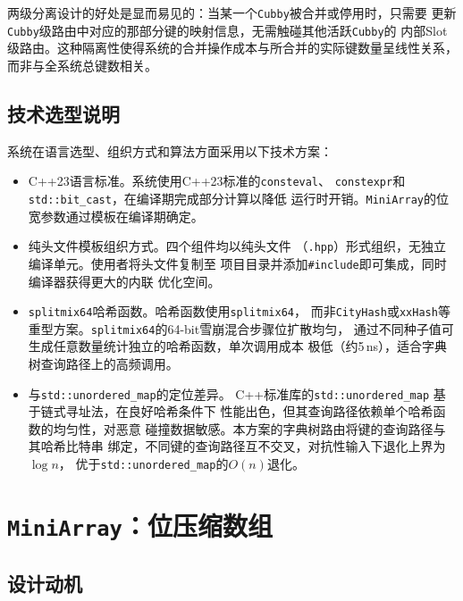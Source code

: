 \documentclass[
    type = bachelor,
    fontset = win,
    decl-page = true,
  ]{njuthesis}
\begin{document}
\noindent 两级分离设计的好处是显而易见的：当某一个\texttt{Cubby}被合并或停用时，只需要
更新\texttt{Cubby}级路由中对应的那部分键的映射信息，无需触碰其他活跃\texttt{Cubby}的
内部Slot级路由。这种隔离性使得系统的合并操作成本与所合并的实际键数量呈线性关系，
而非与全系统总键数相关。

\subsection{技术选型说明}

系统在语言选型、组织方式和算法方面采用以下技术方案：

\begin{itemize}
  \item C++23语言标准。系统使用C++23标准的\texttt{consteval}、
    \texttt{constexpr}和\texttt{std::bit\_cast}，在编译期完成部分计算以降低
    运行时开销。\texttt{MiniArray}的位宽参数通过模板在编译期确定。
  \item 纯头文件模板组织方式。四个组件均以纯头文件
    （\texttt{.hpp}）形式组织，无独立编译单元。使用者将头文件复制至
    项目目录并添加\texttt{\#include}即可集成，同时编译器获得更大的内联
    优化空间。
  \item \texttt{splitmix64}哈希函数。哈希函数使用\texttt{splitmix64}\cite{5}，
    而非\texttt{CityHash}或\texttt{xxHash}等重型方案。\texttt{splitmix64}的64-bit雪崩混合步骤位扩散均匀，
    通过不同种子值可生成任意数量统计独立的哈希函数\cite{9}，单次调用成本
    极低（约5\,ns），适合字典树查询路径上的高频调用。
  \item 与\texttt{std::unordered\_map}的定位差异。\newline
    C++标准库的\texttt{std::unordered\_map}\newline
    基于链式寻址法，在良好哈希条件下
    性能出色，但其查询路径依赖单个哈希函数的均匀性，对恶意
    碰撞数据敏感。本方案的字典树路由将键的查询路径与其哈希比特串
    绑定，不同键的查询路径互不交叉，对抗性输入下退化上界为$\log n$，
    优于\texttt{std::unordered\_map}的$O(n)$退化。
\end{itemize}

\section{\texttt{MiniArray}：位压缩数组}

\subsection{设计动机}
\end{document}
